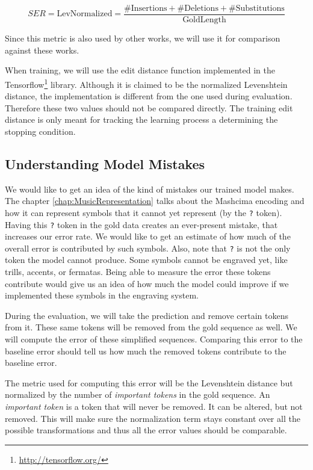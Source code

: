 $$
SER = \text{LevNormalized} = \frac{\#\text{Insertions} + \#\text{Deletions} + \#\text{Substitutions}}{\text{GoldLength}}
$$

Since this metric is also used by other works, we will use it for comparison against these works.

When training, we will use the edit distance function implemented in the Tensorflow\footnote{\href{http://tensorflow.org/}{http://tensorflow.org/}} library. Although it is claimed to be the normalized Levenshtein distance, the implementation is different from the one used during evaluation. Therefore these two values should not be compared directly. The training edit distance is only meant for tracking the learning process a determining the stopping condition.


\subsection{Understanding Model Mistakes}
\label{sec:UnderstandingModelMistakes}

We would like to get an idea of the kind of mistakes our trained model makes. The chapter \ref{chap:MusicRepresentation} talks about the Mashcima encoding and how it can represent symbols that it cannot yet represent (by the \verb`?` token). Having this \verb`?` token in the gold data creates an ever-present mistake, that increases our error rate. We would like to get an estimate of how much of the overall error is contributed by such symbols. Also, note that \verb`?` is not the only token the model cannot produce. Some symbols cannot be engraved yet, like trills, accents, or fermatas. Being able to measure the error these tokens contribute would give us an idea of how much the model could improve if we implemented these symbols in the engraving system.

During the evaluation, we will take the prediction and remove certain tokens from it. These same tokens will be removed from the gold sequence as well. We will compute the error of these simplified sequences. Comparing this error to the baseline error should tell us how much the removed tokens contribute to the baseline error.

The metric used for computing this error will be the Levenshtein distance but normalized by the number of \emph{important tokens} in the gold sequence. An \emph{important token} is a token that will never be removed. It can be altered, but not removed. This will make sure the normalization term stays constant over all the possible transformations and thus all the error values should be comparable.

